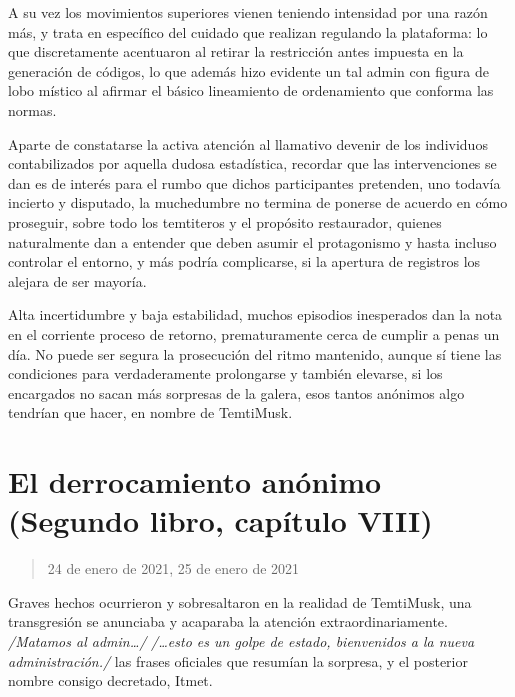 \documentclass[
]{book}
\begin{document}
A su vez los movimientos superiores vienen teniendo intensidad por una razón más, y trata en específico del cuidado que realizan regulando la plataforma: lo que discretamente acentuaron al retirar la restricción antes impuesta en la generación de códigos, lo que además hizo evidente un tal admin con figura de lobo místico al afirmar el básico lineamiento de ordenamiento que conforma las normas.

Aparte de constatarse la activa atención al llamativo devenir de los individuos contabilizados por aquella dudosa estadística, recordar que las intervenciones se dan es de interés para el rumbo que dichos participantes pretenden, uno todavía incierto y disputado, la muchedumbre no termina de ponerse de acuerdo en cómo proseguir, sobre todo los temtiteros y el propósito restaurador, quienes naturalmente dan a entender que deben asumir el protagonismo y hasta incluso controlar el entorno, y más podría complicarse, si la apertura de registros los alejara de ser mayoría.

Alta incertidumbre y baja estabilidad, muchos episodios inesperados dan la nota en el corriente proceso de retorno, prematuramente cerca de cumplir a penas un día. No puede ser segura la prosecución del ritmo mantenido, aunque sí tiene las condiciones para verdaderamente prolongarse y también elevarse, si los encargados no sacan más sorpresas de la galera, esos tantos anónimos algo tendrían que hacer, en nombre de TemtiMusk.

\hypertarget{el-derrocamiento-anuxf3nimo-segundo-libro-capuxedtulo-viii}{%
\section{El derrocamiento anónimo (Segundo libro, capítulo VIII)}\label{el-derrocamiento-anuxf3nimo-segundo-libro-capuxedtulo-viii}}

\begin{quote}
24 de enero de 2021, 25 de enero de 2021
\end{quote}

Graves hechos ocurrieron y sobresaltaron en la realidad de TemtiMusk, una transgresión se anunciaba y acaparaba la atención extraordinariamente. \emph{/Matamos al admin\ldots/} \emph{/\ldots esto es un golpe de estado, bienvenidos a la nueva administración./} las frases oficiales que resumían la sorpresa, y el posterior nombre consigo decretado, Itmet.
\end{document}
